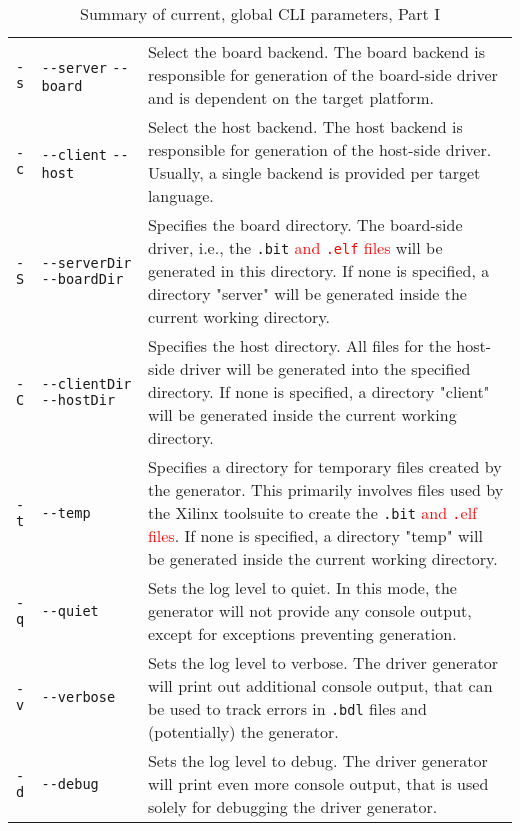 \documentclass{report}
\begin{document}
\begin{table}
\centering
\begin{tabular}{ l p{2cm} | p{9cm} }
\hline
\verb!-s! & \verb!--server! \verb!--board! & Select the board backend. The board backend is responsible for generation of the board-side driver and is dependent on the target platform.\\
\verb!-c! & \verb!--client! \verb!--host! & Select the host backend. The host backend is responsible for generation of the host-side driver. Usually, a single backend is provided per target language.\\ \hline
\verb!-S! & \verb!--serverDir! \verb!--boardDir! & Specifies the board directory. The board-side driver, i.e., the \texttt{.bit} \textcolor{red}{and \texttt{.elf} files} will be generated in this directory. If none is specified, a directory "server" will be generated inside the current working directory.\\
\verb!-C! & \verb!--clientDir! \verb!--hostDir! & Specifies the host directory. All files for the host-side driver will be generated into the specified directory. If none is specified, a directory "client" will be generated inside the current working directory.\\
\verb!-t! & \verb!--temp!  & Specifies a directory for temporary files created by the generator. This primarily involves files used by the Xilinx toolsuite to create the \texttt{.bit} \textcolor{red}{and \texttt.elf files}. If none is specified, a directory "temp" will be generated inside the current working directory.\\ \hline
\verb!-q! & \verb!--quiet! & Sets the log level to quiet. In this mode, the generator will not provide any console output, except for exceptions preventing generation.\\
\verb!-v! & \verb!--verbose! & Sets the log level to verbose. The driver generator will print out additional console output, that can be used to track errors in \texttt{.bdl} files and (potentially) the generator.\\
\verb!-d! & \verb!--debug! & Sets the log level to debug. The driver generator will print even more console output, that is used solely for debugging the driver generator.\\ \hline
\end{tabular}
\caption{Summary of current, global CLI parameters, Part I}
\label{tab:cliParams1}
\end{table}
\end{document}
